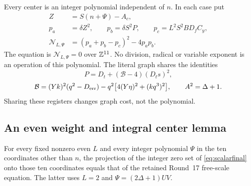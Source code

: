 Every center is an integer polynomial independent of $n$. In each case put
\begin{align}
 Z&=S(n+\Psi)-A_c,\nonumber\\
 p_a&=\delta Z^2,\qquad p_b=\delta S^2P,
 \qquad p_c=L^2S^2BD_fC_y,\nonumber\\
 \mathcal N_{L,\Psi}&=(p_a+p_b-p_c)^2-4p_ap_b.
 \label{eq:scalarfinal}
\end{align}
The equation is $\mathcal N_{L,\Psi}=0$ over $\mathbb Z^{11}$. No division,
radical or variable exponent is an operation of this polynomial. The
literal graph shares the identities
\[
 P=D_t+(\mathcal B-4)(D_ts)^2,
\]
\[
 \mathcal B=(Yk)^2(q^2-D_{\rm err})
       -q^2\bigl[4(Y\eta)^2+(kq^3)^2\bigr],
 \qquad A^2=\Delta+1.
\]
Sharing these registers changes graph cost, not the polynomial.

\subsection{An even weight and integral center lemma}
\begin{theorem}\label{thm:evenweight}
For every fixed nonzero even $L$ and every integer polynomial $\Psi$ in
the ten coordinates other than $n$, the projection of the integer zero
set of \eqref{eq:scalarfinal} onto those ten coordinates equals that of
the retained Round~17 free-scale equation. The latter uses
$L=2$ and $\Psi=(2\Delta+1)UV$.
\end{theorem}
